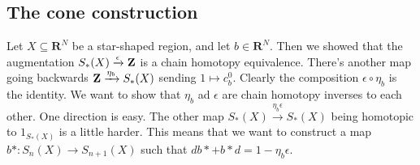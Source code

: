 \subsection{The cone construction}
Let $X\subseteq \mathbf{R}^N$ be a star-shaped region, and let $b\in\mathbf{R}^N$. Then we showed that the augmentation $S_\ast(X)\xrightarrow{\epsilon}\mathbf Z$ is a chain homotopy equivalence. There's another map going backwards $\mathbf Z\xrightarrow{\eta_b} S_\ast(X)$ sending $1\mapsto c^0_b$. Clearly the composition $\epsilon\circ\eta_b$ is the identity. We want to show that $\eta_b$ ad $\epsilon$ are chain homotopy inverses to each other. One direction is easy. The other map $S_\ast(X)\xrightarrow{\eta_b\epsilon}S_\ast(X)$ being homotopic to $1_{S_\ast(X)}$ is a little harder. This means that we want to construct a map $b\ast:S_n(X)\to S_{n+1}(X)$ such that $db\ast+b\ast d=1-\eta_b\epsilon$.

